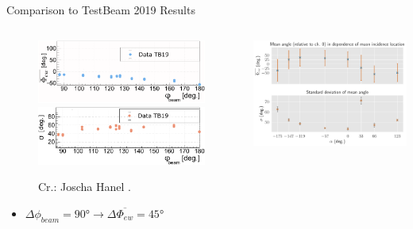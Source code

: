 \documentclass[aspectratio=169]{beamer}
\begin{document}
	\begin{frame}{Comparison to TestBeam 2019 Results}
		\vspace{-.7cm}
		\begin{columns}
			
			\begin{column}{0.5\textwidth}
				\centering
				\begin{figure}
				\caption{Cr.: Joscha Hanel \cite{HANEL}.}
				\vspace{-.2cm}
				\includegraphics[width=.9\textwidth]{pictures/hanel_phi-ew.pdf}
				\includegraphics[width=.9\textwidth]{pictures/hanel_phi-std.pdf}
				\end{figure}
			\vspace{-.2cm}
				\begin{itemize}
					\item $\Delta \phi_{beam} = \ang{90} \rightarrow \Delta \overline{\Phi_{ew}} = \ang{45}$
				\end{itemize}
				
			\end{column}
			
			\begin{column}{0.5\textwidth}
				\centering
				\includegraphics[width=1.1\textwidth]{pictures/phi-ew-std-sep.pdf}
				

\end{column}
\end{columns}
\end{frame}
\end{document}
